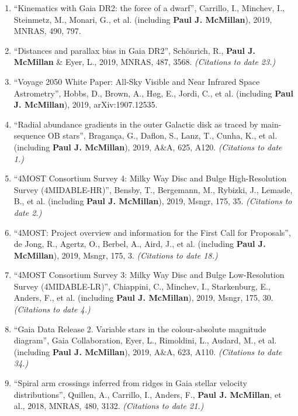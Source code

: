 \documentclass{resume}
\begin{document}
\begin{enumerate}
\item ``Kinematics with Gaia DR2: the force of a dwarf'', Carrillo, I., Minchev, I., Steinmetz, M., Monari, G., et al. (including \textbf{Paul J. McMillan}), 2019, MNRAS, 490, 797.

\item ``Distances and parallax bias in Gaia DR2'', Sch\"onrich, R., \textbf{Paul J. McMillan} \& Eyer, L., 2019, MNRAS, 487, 3568. \textit{(Citations to date 23.)}

\item ``Voyage 2050 White Paper: All-Sky Visible and Near Infrared Space Astrometry'', Hobbs, D., Brown, A., H{\o}g, E., Jordi, C., et al. (including \textbf{Paul J. McMillan}), 2019, arXiv:1907.12535.

\item ``Radial abundance gradients in the outer Galactic disk as traced by main-sequence OB stars'', Bragan\c{c}a, G., Daflon, S., Lanz, T., Cunha, K., et al. (including \textbf{Paul J. McMillan}), 2019, A\&A, 625, A120. \textit{(Citations to date 1.)}

\item ``4MOST Consortium Survey 4: Milky Way Disc and Bulge High-Resolution Survey (4MIDABLE-HR)'', Bensby, T., Bergemann, M., Rybizki, J., Lemasle, B., et al. (including \textbf{Paul J. McMillan}), 2019, Msngr, 175, 35. \textit{(Citations to date 2.)}

\item ``4MOST: Project overview and information for the First Call for Proposals'', de Jong, R., Agertz, O., Berbel, A., Aird, J., et al. (including \textbf{Paul J. McMillan}), 2019, Msngr, 175, 3. \textit{(Citations to date 18.)}

\item ``4MOST Consortium Survey 3: Milky Way Disc and Bulge Low-Resolution Survey (4MIDABLE-LR)'', Chiappini, C., Minchev, I., Starkenburg, E., Anders, F., et al. (including \textbf{Paul J. McMillan}), 2019, Msngr, 175, 30. \textit{(Citations to date 4.)}

\item ``Gaia Data Release 2. Variable stars in the colour-absolute magnitude diagram'', Gaia Collaboration, Eyer, L., Rimoldini, L., Audard, M., et al. (including \textbf{Paul J. McMillan}), 2019, A\&A, 623, A110. \textit{(Citations to date 34.)}

\item ``Spiral arm crossings inferred from ridges in Gaia stellar velocity distributions'', Quillen, A., Carrillo, I., Anders, F., \textbf{Paul J. McMillan}, et al., 2018, MNRAS, 480, 3132. \textit{(Citations to date 21.)}


\end{enumerate}
\end{document}
